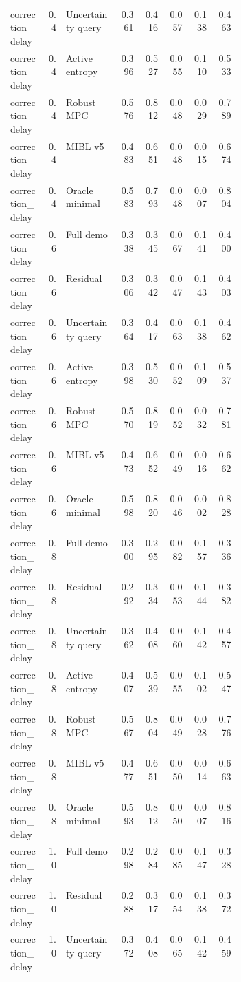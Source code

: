 \documentclass{article}
\begin{document}
\begin{center}
\begin{longtable}{p{0.16\linewidth}rp{0.23\linewidth}rrrrr}
correction\_delay & 0.4 & Uncertainty query & 0.361 & 0.416 & 0.057 & 0.138 & 0.463\\
correction\_delay & 0.4 & Active entropy & 0.396 & 0.527 & 0.055 & 0.110 & 0.533\\
correction\_delay & 0.4 & Robust MPC & 0.576 & 0.812 & 0.048 & 0.029 & 0.789\\
correction\_delay & 0.4 & MIBL v5 & 0.483 & 0.651 & 0.048 & 0.015 & 0.674\\
correction\_delay & 0.4 & Oracle minimal & 0.583 & 0.793 & 0.048 & 0.007 & 0.804\\
correction\_delay & 0.6 & Full demo & 0.338 & 0.345 & 0.067 & 0.141 & 0.400\\
correction\_delay & 0.6 & Residual & 0.306 & 0.342 & 0.047 & 0.143 & 0.403\\
correction\_delay & 0.6 & Uncertainty query & 0.364 & 0.417 & 0.063 & 0.138 & 0.462\\
correction\_delay & 0.6 & Active entropy & 0.398 & 0.530 & 0.052 & 0.109 & 0.537\\
correction\_delay & 0.6 & Robust MPC & 0.570 & 0.819 & 0.052 & 0.032 & 0.781\\
correction\_delay & 0.6 & MIBL v5 & 0.473 & 0.652 & 0.049 & 0.016 & 0.662\\
correction\_delay & 0.6 & Oracle minimal & 0.598 & 0.820 & 0.046 & 0.002 & 0.828\\
correction\_delay & 0.8 & Full demo & 0.300 & 0.295 & 0.082 & 0.157 & 0.336\\
correction\_delay & 0.8 & Residual & 0.292 & 0.334 & 0.053 & 0.144 & 0.382\\
correction\_delay & 0.8 & Uncertainty query & 0.362 & 0.408 & 0.060 & 0.142 & 0.457\\
correction\_delay & 0.8 & Active entropy & 0.407 & 0.539 & 0.055 & 0.102 & 0.547\\
correction\_delay & 0.8 & Robust MPC & 0.567 & 0.804 & 0.049 & 0.028 & 0.776\\
correction\_delay & 0.8 & MIBL v5 & 0.477 & 0.651 & 0.050 & 0.014 & 0.663\\
correction\_delay & 0.8 & Oracle minimal & 0.593 & 0.812 & 0.050 & 0.007 & 0.816\\
correction\_delay & 1.0 & Full demo & 0.298 & 0.284 & 0.085 & 0.147 & 0.328\\
correction\_delay & 1.0 & Residual & 0.288 & 0.317 & 0.054 & 0.138 & 0.372\\
correction\_delay & 1.0 & Uncertainty query & 0.372 & 0.408 & 0.065 & 0.142 & 0.459\\

\end{longtable}
\end{center}
\end{document}
